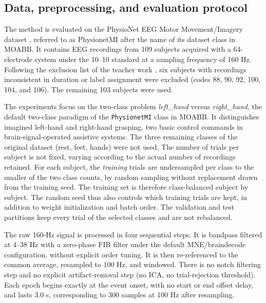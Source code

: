 \subsection{Data, preprocessing, and evaluation protocol}
\label{sec:dulieu}

The method is evaluated on the PhysioNet EEG Motor Movement/Imagery
dataset \cite{schalk2004bci2000, goldberger2000physiobank}, referred to as
PhysionetMI after the name of its dataset class in MOABB. It contains EEG
recordings from 109 subjects acquired with a 64-electrode system under the
10--10 standard at a sampling frequency of 160 Hz. Following the exclusion
list of the teacher work \cite{zoumpourlis2024motor}, six subjects with
recordings inconsistent in duration or label assignment were excluded
(codes 88, 90, 92, 100, 104, and 106). The remaining 103 subjects were used.

The experiments focus on the two-class problem \emph{left\_hand} versus
\emph{right\_hand}, the default two-class paradigm of the
\texttt{PhysionetMI} class in MOABB. It distinguishes imagined left-hand and
right-hand grasping, two basic control commands in brain-signal-operated
assistive systems. The three remaining classes
of the original dataset (rest, feet, hands) were not used. The
number of trials per subject is not fixed, varying according to the
actual number of recordings retained. For each subject, the \emph{training} trials are undersampled per class
to the smaller of the two class counts, by random sampling without
replacement drawn from the training seed. The training set is therefore
class-balanced subject by subject. The random seed thus also controls
which training trials are kept, in addition to weight initialization and
batch order. The validation and test partitions keep every trial of the
selected classes and are not rebalanced.

The raw 160-Hz signal is processed in four sequential steps. It is
bandpass filtered at 4--38 Hz with a zero-phase FIR filter under the
default MNE/braindecode configuration, without explicit order tuning. It is
then re-referenced to the common average, resampled to 100 Hz, and
windowed. There is no notch filtering
step and no explicit artifact-removal step (no ICA, no
trial-rejection threshold). Each epoch begins exactly at the event
onset, with no start or end offset delay, and lasts 3.0 s,
corresponding to 300 samples at 100 Hz after resampling.

